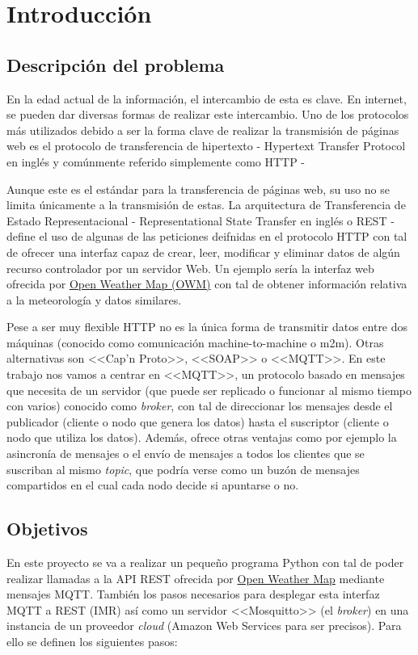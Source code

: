 \documentclass{scrbook}
\begin{document}



\tableofcontents

\chapter{Introducción}
\section{Descripción del problema}
En la edad actual de la información, el intercambio de esta es clave. En internet, se pueden dar diversas formas de realizar este intercambio. Uno de los protocolos más utilizados debido a ser la forma clave de realizar la transmisión de páginas web es el protocolo de transferencia de hipertexto - Hypertext Transfer Protocol en inglés y comúnmente referido simplemente como HTTP -

Aunque este es el estándar para la transferencia de páginas web, su uso no se limita únicamente a la transmisión de estas. La arquitectura de Transferencia de Estado Representacional - Representational State Transfer en inglés o REST - define el uso de algunas de las peticiones deifnidas en el protocolo HTTP con tal de ofrecer una interfaz capaz de crear, leer, modificar y eliminar datos de algún recurso controlador por un servidor Web. Un ejemplo sería la interfaz web ofrecida por \href{http://openweathermap.org/}{Open Weather Map (OWM)} con tal de obtener información relativa a la meteorología y datos similares.

Pese a ser muy flexible HTTP no es la única forma de transmitir datos entre dos máquinas (conocido como comunicación machine-to-machine o m2m). Otras alternativas son <<Cap'n Proto>>, <<SOAP>> o <<MQTT>>. En este trabajo nos vamos a centrar en <<MQTT>>, un protocolo basado en mensajes que necesita de un servidor (que puede ser replicado o funcionar al mismo tiempo con varios) conocido como \textit{broker}, con tal de direccionar los mensajes desde el publicador (cliente o nodo que genera los datos) hasta el suscriptor (cliente o nodo que utiliza los datos). Además, ofrece otras ventajas como por ejemplo la asincronía de mensajes o el envío de mensajes a todos los clientes que se suscriban al mismo \textit{topic}, que podría verse como un buzón de mensajes compartidos en el cual cada nodo decide si apuntarse o no.

\section{Objetivos}
\label{cap:objetivos}
En este proyecto se va a realizar un pequeño programa Python con tal de poder realizar llamadas a la API REST ofrecida por \href{http://openweathermap.org/}{Open Weather Map} mediante mensajes MQTT. También los pasos necesarios para desplegar esta interfaz MQTT a REST (IMR) así como un servidor <<Mosquitto>> (el \textit{broker}) en una instancia de un proveedor \textit{cloud} (Amazon Web Services para ser precisos). Para ello se definen los siguientes pasos:
\end{document}
